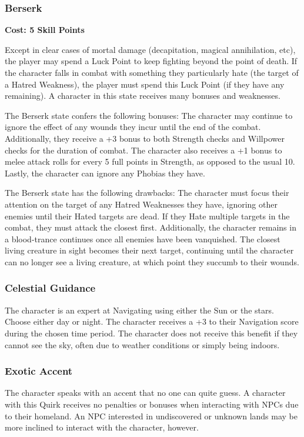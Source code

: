 \documentclass[oneside]{book}
\begin{document}
\begin{multicols}{2}
\subsubsection{Berserk}
\textbf{\small Cost: 5 Skill Points}

Except in clear cases of mortal damage (decapitation, magical annihilation, etc), the player may spend a Luck Point to keep fighting beyond the point of death. If the character falls in combat with something they particularly hate (the target of a Hatred Weakness), the player must spend this Luck Point (if they have any remaining). A character in this state receives many bonuses and weaknesses.

The Berserk state confers the following bonuses: The character may continue to ignore the effect of any wounds they incur until the end of the combat. Additionally, they receive a +3 bonus to both Strength checks and Willpower checks for the duration of combat. The character also receives a +1 bonus to melee attack rolls for every 5 full points in Strength, as opposed to the usual 10. Lastly, the character can ignore any Phobias they have.

The Berserk state has the following drawbacks: The character must focus their attention on the target of any Hatred Weaknesses they have, ignoring other enemies until their Hated targets are dead. If they Hate multiple targets in the combat, they must attack the closest first. Additionally, the character remains in a blood-trance continues once all enemies have been vanquished. The closest living creature in sight becomes their next target, continuing until the character can no longer see a living creature, at which point they succumb to their wounds. 

\subsubsection{Celestial Guidance}
The character is an expert at Navigating using either the Sun or the stars. Choose either day or night. The character receives a +3 to their Navigation score during the chosen time period. The character does not receive this benefit if they cannot see the sky, often due to weather conditions or simply being indoors.

\subsubsection{Exotic Accent}
The character speaks with an accent that no one can quite guess. A character with this Quirk receives no penalties or bonuses when interacting with NPCs due to their homeland. An NPC interested in undiscovered or unknown lands may be more inclined to interact with the character, however. 


\end{multicols}
\end{document}
